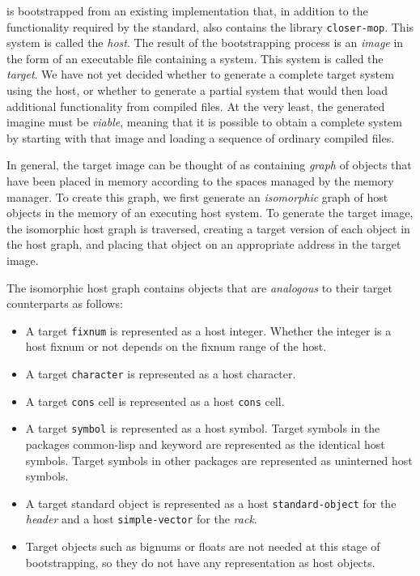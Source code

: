 \sysname{} is bootstrapped from an existing \commonlisp{}
implementation that, in addition to the functionality required by the
standard, also contains the library \texttt{closer-mop}.  This
\commonlisp{} system is called the \emph{host}.  The result of the
bootstrapping process is an \emph{image} in the form of an executable
file containing a \sysname{} system.  This system is called the
\emph{target}.  We have not yet decided whether to generate a complete
target system using the host, or whether to generate a partial system
that would then load additional functionality from compiled files.  At
the very least, the generated imagine must be \emph{viable}, meaning
that it is possible to obtain a complete \commonlisp{} system by
starting with that image and loading a sequence of ordinary compiled
files.

In general, the target image can be thought of as containing
\emph{graph} of \commonlisp{} objects that have been placed in memory
according to the spaces managed by the memory manager.  To create this
graph, we first generate an \emph{isomorphic} graph of host objects in
the memory of an executing host system.  To generate the target image,
the isomorphic host graph is traversed, creating a target version of
each object in the host graph, and placing that object on an
appropriate address in the target image.

The isomorphic host graph contains objects that are \emph{analogous}
to their target counterparts as follows:

\begin{itemize}
\item A target \texttt{fixnum} is represented as a host integer.
  Whether the integer is a host fixnum or not depends on the fixnum
  range of the host.
\item A target \texttt{character} is represented as a host character.
\item A target \texttt{cons} cell is represented as a host
  \texttt{cons} cell.
\item A target \texttt{symbol} is represented as a host symbol.
  Target symbols in the packages {\sc common-lisp} and {\sc keyword}
  are represented as the identical host symbols.  Target symbols in
  other packages are represented as uninterned host symbols.
\item A target standard object is represented as a host
  \texttt{standard-object} for the \emph{header} and a host
  \texttt{simple-vector} for the \emph{rack}.
\item Target objects such as bignums or floats are not needed at this
  stage of bootstrapping, so they do not have any representation as
  host objects.
\end{itemize}

